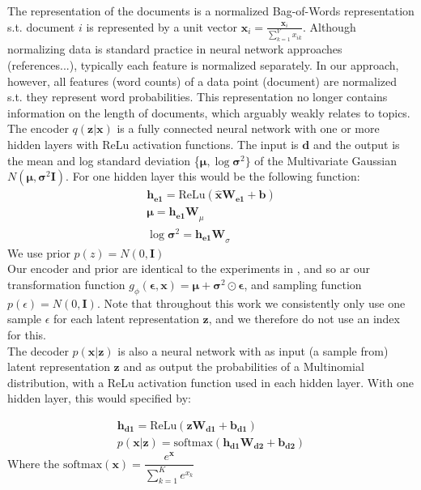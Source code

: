 \documentclass{report}
\begin{document}
The representation of the documents is a normalized Bag-of-Words representation s.t. document $i$ is represented by a unit vector $\hat{\mathbf{x}_i} = \frac{\mathbf{x}_i}{\sum_{k=1}^{V}x_{ik}}$. Although normalizing data is standard practice in neural network approaches (references...), typically each feature is normalized separately. In our approach, however, all features (word counts) of a data point (document) are normalized s.t. they represent word probabilities. This representation no longer contains information on the length of documents, which arguably weakly relates to topics.
\\
The encoder $q(\mathbf{z}|\mathbf{x})$ is a fully connected neural network with one or more hidden layers with ReLu activation functions. The input is $\mathbf{d}$ and the output is the mean and log standard deviation \{$\boldsymbol{\mu}, \log \boldsymbol{\sigma} ^2\}$ of the Multivariate Gaussian $N(\boldsymbol{\mu}, \boldsymbol{\sigma} ^2\textbf{I})$. For one hidden layer this would be the following function:
\begin{align}
\mathbf{h_{e1}} = \text{ReLu}(\mathbf{\hat{x}}\mathbf{W_{e1}} + \mathbf{b}) \\
\boldsymbol{\mu} = \mathbf{h_{e1}W}_{\mu} \\
\log \boldsymbol{\sigma}^2 = \mathbf{h_{e1}W}_{\sigma}
\end{align} 
We use prior $p(z) = N(0,\textbf{I})$
\\
Our encoder and prior are identical to the experiments in \cite{kingma2013auto}, and so ar our transformation function $g_\phi(\boldsymbol{\epsilon},\mathbf{x}) = \boldsymbol{\mu} + \boldsymbol{\sigma}^2\odot \boldsymbol{\epsilon}$, and sampling function $p(\epsilon) = N(0,\textbf{I})$. Note that throughout this work we consistently only use one sample $\epsilon$ for each latent representation $\mathbf{z}$, and we therefore do not use an index for this.\\
The decoder $p(\mathbf{x}|\mathbf{z})$ is also a neural network with as input (a sample from) latent representation $\mathbf{z}$ and as output the probabilities of a Multinomial distribution, with a ReLu activation function used in each hidden layer. With one hidden layer, this would specified by:

\begin{align}
\mathbf{h_{d1}} = \text{ReLu}(\mathbf{zW_{d1}+b_{d1}})
\\
p(\mathbf{x}|\mathbf{z}) = \text{softmax} (\mathbf{h_{d1}W_{d2}}+\mathbf{b_{d2}})
\end{align}
Where the $\text{softmax}(\mathbf{x}) = \dfrac{e^{\mathbf{x}}}{\sum_{k=1}^{K}e^{x_k}}$
\end{document}
